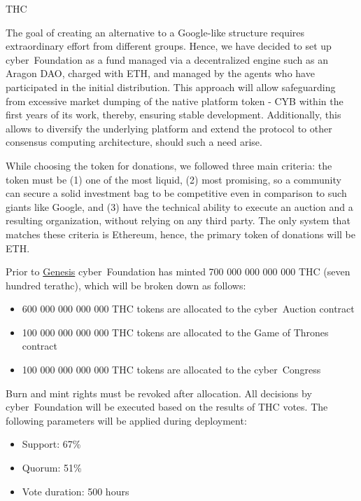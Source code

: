 \documentclass[8pt,oneside]{amsart}
\makeatletter
\renewcommand\subsection{\@startsection{subsection}
                                    {2}{\z@}
                                    {-3.25ex\@plus -1ex \@minus -.2ex}
                                    {0ex \@plus .2ex}
                                    {\play\Large}
                        }
\newcommand{\titleSection}[1]{\subsection{#1}}
\newenvironment{Figure}
  {\par\medskip\noindent\minipage{\linewidth}}
  {\endminipage\par\medskip}
\makeatother
\begin{document}
\titleSection{THC}\label{thc}

The goal of creating an alternative to a Google-like structure requires extraordinary effort from different groups. Hence, we have decided to set up cyber~Foundation as a fund managed via a decentralized engine such as an Aragon DAO, charged with ETH, and managed by the agents who have participated in the initial distribution. This approach will allow safeguarding from excessive market dumping of the native platform token - CYB within the first years of its work, thereby, ensuring stable development. Additionally, this allows to diversify the underlying platform and extend the protocol to other consensus computing architecture, should such a need arise.

While choosing the token for donations, we followed three main criteria: the token must be (1) one of the most liquid, (2) most promising, so a community can secure a solid investment bag to be competitive even in comparison to such giants like Google, and (3) have the technical ability to execute an auction and a resulting organization, without relying on any third party. The only system that matches these criteria is Ethereum, hence, the primary token of donations will be ETH.

Prior to \hyperlink{genesis}{Genesis} cyber~Foundation has minted 700 000 000 000 000 THC (seven hundred terathc), which will be broken down as follows:

\begin{itemize}
\item 600 000 000 000 000 THC tokens are allocated to the cyber~Auction contract
\item 100 000 000 000 000 THC tokens are allocated to the Game of Thrones contract
\item 100 000 000 000 000 THC tokens are allocated to the cyber~Congress
\end{itemize}

\begin{Figure}
 \centering
 
\end{Figure}

Burn and mint rights must be revoked after allocation. All decisions by cyber~Foundation will be executed based on the results of THC votes. The following parameters will be applied during deployment:

\begin{itemize}
\item Support: 67\%
\item Quorum: 51\%
\item Vote duration: 500 hours
\end{itemize}
\end{document}
